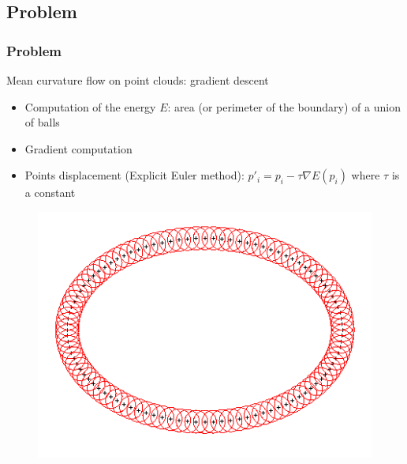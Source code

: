 \documentclass{beamer}
\begin{document}
\subsection{Problem}
\begin{frame}
    \frametitle{Problem}

    Mean curvature flow on point clouds: gradient descent
    \begin{itemize}
        \item Computation of the energy $ E $: area (or perimeter of the boundary) of a union of balls
        \item Gradient computation
        \item Points displacement (Explicit Euler method): $ p'_i = p_i - \tau
            \nabla E (p_i) $ where $ \tau $ is a constant
    \end{itemize}

    \begin{figure}
        \centering
        \includegraphics[scale=0.28]{img/ellipse-balls-15}
    \end{figure}
\end{frame}
\end{document}
